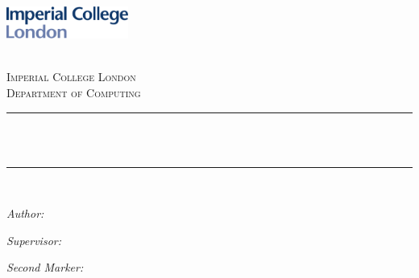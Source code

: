 \begin{titlepage}

\newcommand{\HRule}{\rule{\linewidth}{0.5mm}} %



\includegraphics[width = 4cm]{./figures/imperial}\\[0.5cm] 

\begin{center} %

\textsc{\LARGE \reporttype}\\[1.5cm] 
\textsc{\Large Imperial College London}\\[0.5cm] 
\textsc{\large Department of Computing}\\[0.5cm] 

\HRule \\[0.4cm]
{ \huge \bfseries \reporttitle}\\ %
\HRule \\[1.5cm]
\end{center}

\noindent
\begin{minipage}{.5\linewidth}
\begin{flushleft} \large
\textit{Author:}\\
\reportauthor
\end{flushleft}
\end{minipage}%
\begin{minipage}{.5\linewidth}
\begin{flushright} \large
\textit{Supervisor:}\\
\supervisor
\end{flushright}
\begin{flushright} \large
\textit{Second Marker:}\\
\sndmarker
\end{flushright}
\end{minipage}

\vspace{2cm}
\makeatletter
\centering
\@date 


\vfill %



\makeatother


\end{titlepage}

